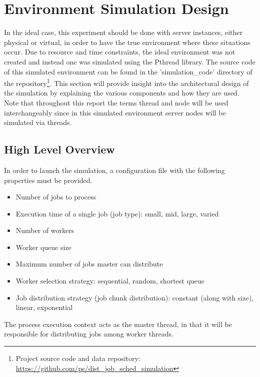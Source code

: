 \documentclass{article}
\begin{document}
\section{Environment Simulation Design} \label{environmentSimulationDesign}
In the ideal case, this experiment should be done with server instances, either physical or virtual, in order to have the true environment where these situations occur. Due to resource and time constraints, the ideal environment was not created and instead one was simulated using the Pthread library. The source code of this simulated environment can be found in the 'simulation\_code' directory of the repository\footnote{Project source code and data repository: \url{https://github.com/ps/dist_job_sched_simulation}}. This section will provide insight into the architectural design of the simulation by explaining the various components and how they are used. Note that throughout this report the terms thread and node will be used interchangeably since in this simulated environment server nodes will be simulated via threads.

\subsection{High Level Overview}
In order to launch the simulation, a configuration file with the following properties must be provided.
\begin{itemize}
  \item Number of jobs to process
  \item Execution time of a single job (job type): small, mid, large, varied
  \item Number of workers
  \item Worker queue size
  \item Maximum number of jobs master can distribute
  \item Worker selection strategy: sequential, random, shortest queue
  \item Job distribution strategy (job chunk distribution): constant (along with size), linear, exponential
\end{itemize}
The process execution context acts as the master thread, in that it will be responsible for distributing jobs among worker threads.
\end{document}
